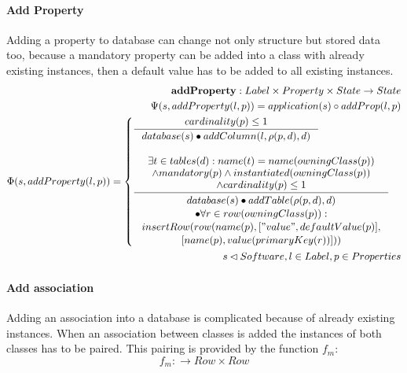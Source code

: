 \documentclass[11pt]{article}
\begin{document}
\paragraph{Add Property} Adding a property to database can change not only structure but stored data too, because a mandatory property can be added into a class with already existing instances, then a default value has to be added to all existing instances.
\begin{align*}
	\mathbf{addProperty} : Label \times Property \times State \rightarrow State \\
	\Psi(s, addProperty(l, p)) = application(s) \circ addProp(l,p) \\
	\Phi(s, addProperty(l, p)) = \begin{cases}
    		\inference{cardinality(p) \leq 1}{database(s) \bullet addColumn(l, \rho(p,d), d)} \\ \\
	    \inference{ \exists t \in tables(d) : name(t) = name(owningClass(p)) \\ \wedge mandatory(p) \wedge instantiated(owningClass(p)) \\ \wedge cardinality(p) \leq 1}{\begin{gathered}
   database(s) \bullet addTable(\rho(p,d), d) \\ \bullet \forall r \in row(owningClass(p)) :\\ insertRow(row(name(p), ["value", defaultValue(p)], \\ [name(p), value(primaryKey(r))])) 
    \end{gathered} } 
   \end{cases}\\
	s \lhd Software, l \in Label, p \in Properties
\end{align*}


\paragraph{Add association} Adding an association into a database is complicated because of already existing instances. When an association between classes is added the instances of both classes has to be paired. This pairing is provided by the function $f_m$:
$$f_m : \rightarrow Row \times Row $$
\end{document}
